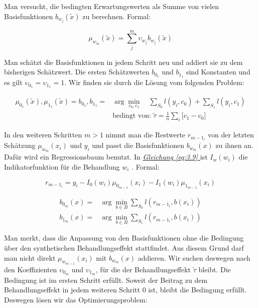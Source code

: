 \documentclass[12pt,a4paper,twoside]{scrartcl}
\numberwithin{equation}{section}
\renewcommand*{\refeq}[1]{\emph{\hyperref[#1]{Gleichung \ref*{#1} }}}
\begin{document}
\noindent
Man versucht, die bedingten Erwartungswerten als Summe von vielen Basisfunktionen $b_{w_j}(\tilde{x})$ zu berechnen. Formal:\par

\begin{equation}\label{eq:3.7}
 \mu_{w_m}(\tilde{x}) = \sum_j^m \upsilon_{w_j}b_{w_j}(\tilde{x})
\end{equation}

\noindent
Man schätzt die Basisfunktionen in jedem Schritt neu und addiert sie zu dem bisherigen Schätzwert. Die ersten Schätzwerten $b_{0_1}$ und $b_{1_1}$ sind Konstanten und es gilt $\upsilon_{0_1} = \upsilon_{1_1} = 1$. Wir finden sie durch die Lösung vom folgenden Problem\cite{schuler2017synth}: \par 

\begin{equation}\label{eq:3.8}
\begin{split}
	\mu_{0_1}(\tilde{x}),\mu_{1_1}(\tilde{x}) = b_{0_1},b_{1_1} = &\arg\min_{c_0,c_1} \quad \sum_{S_0} l(y_i,c_0) + \sum_{S_1} l(y_i,c_1)\\
 &\text{bedingt von: } \tilde{\tau} = \frac{1}{n} \sum_i \big [c_1 - c_0 \big ]
\end{split}
\end{equation}

\noindent
In den weiteren Schritten $m>1$ nimmt man die Restwerte $r_{{m-1}_i}$ von der letzten Schätzung $\mu_{w_m}(x_i)$ und $y_i$ und passt die Basisfunktionen $b_{w_m}(x)$ zu ihnen an. Dafür wird ein Regressionsbaum benutzt. In \refeq{eq:3.9} ist $I_w(w_i)$ die Indikatorfunktion für die Behandlung $w_i$ \cite{schuler2017synth}. Formal:\par

\begin{equation}\label{eq:3.9}
r_{{m-1}_i} = y_i - I_0(w_i)\mu_{0_{m-1}}(x_i)-I_1(w_i)\mu_{1_{m-1}}(x_i)
\end{equation}

\begin{equation}\label{eq:3.10}
\begin{split}
	 b_{0_m}(x) = &\arg\min_{b \in B} \sum_{S_0} l(r_{{m-1}_i},b(x_i))\\
	 b_{1_m}(x) = &\arg\min_{b \in B} \sum_{S_1} l(r_{{m-1}_i},b(x_i))
\end{split}
\end{equation}

\noindent
Man merkt, dass die Anpassung von den Basisfunktionen ohne die Bedingung über den synthetischen Behandlungseffekt stattfindet. Aus diesem Grund darf man nicht direkt $\mu_{w_{m-1}}(x_i)$ mit $b_{w_m}(x)$ addieren. Wir suchen deswegen nach den Koeffizienten $\upsilon_{0_m}$ und $\upsilon_{1_m}$, für die der Behandlungseffekt $\tilde{\tau}$ bleibt. Die Bedingung ist im ersten Schritt erfüllt. Soweit der Beitrag zu dem Behandlungseffekt in jedem weiteren Schritt $0$ ist, bleibt die Bedingung erfüllt\cite{schuler2017synth}. Deswegen lösen wir das Optimierungsproblem:\par 
\end{document}
